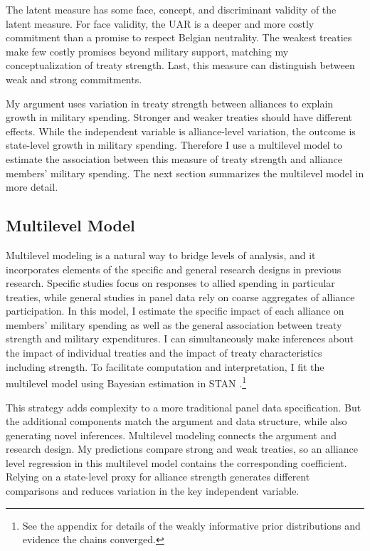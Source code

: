 \documentclass[12pt]{article}
\begin{document}
The latent measure has some face, concept, and discriminant validity of the latent measure. 
For face validity, the UAR is a deeper and more costly commitment than a promise to respect Belgian neutrality. 
The weakest treaties make few costly promises beyond military support, matching my conceptualization of treaty strength. 
Last, this measure can distinguish between weak and strong commitments. 


My argument uses variation in treaty strength between alliances to explain growth in military spending.
Stronger and weaker treaties should have different effects. 
While the independent variable is alliance-level variation, the outcome is state-level growth in military spending. 
Therefore I use a multilevel model to estimate the association between this measure of treaty strength and alliance members' military spending.  
The next section summarizes the multilevel model in more detail. 


\subsection{Multilevel Model} 


Multilevel modeling is a natural way to bridge levels of analysis, and it incorporates elements of the specific and general research designs in previous research. 
Specific studies focus on responses to allied spending in particular treaties, while general studies in panel data rely on coarse aggregates of alliance participation.
In this model, I estimate the specific impact of each alliance on members' military spending as well as the general association between treaty strength and military expenditures. 
I can simultaneously make inferences about the impact of individual treaties and the impact of treaty characteristics including strength. 
To facilitate computation and interpretation, I fit the multilevel model using Bayesian estimation in STAN \citep{Carpenteretal2016}.\footnote{See the appendix for details of the weakly informative prior distributions and evidence the chains converged.}


This strategy adds complexity to a more traditional panel data specification. 
But the additional components match the argument and data structure, while also generating novel inferences. 
Multilevel modeling connects the argument and research design. 
My predictions compare strong and weak treaties, so an alliance level regression in this multilevel model contains the corresponding coefficient.
Relying on a state-level proxy for alliance strength generates different comparisons and reduces variation in the key independent variable.
\end{document}

